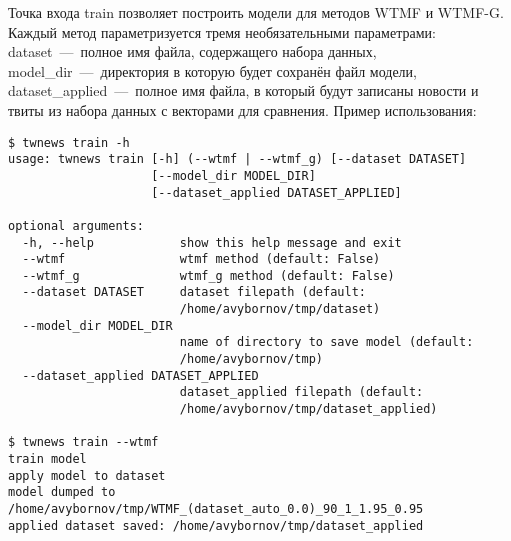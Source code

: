         Точка входа train позволяет построить модели для методов WTMF и WTMF-G. Каждый метод параметризуется тремя необязательными параметрами:
        dataset~---~полное имя файла, содержащего набора данных, model\_dir~---~директория в которую будет сохранён файл модели,
        dataset_applied~---~полное имя файла, в который будут записаны новости и твиты из набора данных с векторами для сравнения.
        Пример использования:
        \begin{lstlisting}
$ twnews train -h
usage: twnews train [-h] (--wtmf | --wtmf_g) [--dataset DATASET]
                    [--model_dir MODEL_DIR]
                    [--dataset_applied DATASET_APPLIED]

optional arguments:
  -h, --help            show this help message and exit
  --wtmf                wtmf method (default: False)
  --wtmf_g              wtmf_g method (default: False)
  --dataset DATASET     dataset filepath (default:
                        /home/avybornov/tmp/dataset)
  --model_dir MODEL_DIR
                        name of directory to save model (default:
                        /home/avybornov/tmp)
  --dataset_applied DATASET_APPLIED
                        dataset_applied filepath (default:
                        /home/avybornov/tmp/dataset_applied)

$ twnews train --wtmf
train model
apply model to dataset
model dumped to /home/avybornov/tmp/WTMF_(dataset_auto_0.0)_90_1_1.95_0.95
applied dataset saved: /home/avybornov/tmp/dataset_applied


        \end{lstlisting}


